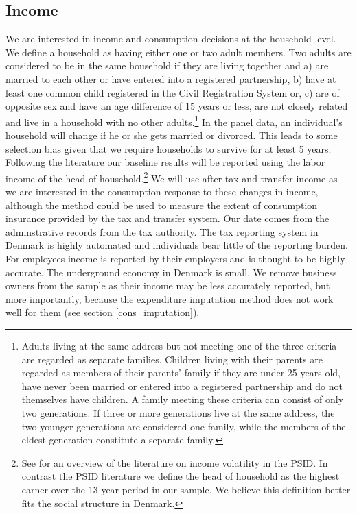 \documentclass[titlepage]{\econtex}\newcommand{\texname}{ConsumptionHeterogeneity}
\begin{document}
\subsection{Income} \label{income}
We are interested in income and consumption decisions at the household level. We define a household as having either one or two adult members. Two adults are considered to be in the same household if they are living together and a) are married to each other or have entered into a registered partnership, b) have at least one common child registered in the Civil Registration System or, c) are of opposite sex and have an age difference of 15 years or less, are not closely related and live in a household with no other adults.\footnote{Adults living at the same address but not meeting one of the three criteria are regarded as separate families. Children living with their parents are regarded as members of their parents' family if they are under 25 years old, have never been married or entered into a registered partnership and do not themselves have children. A family meeting these criteria can consist of only two generations. If three or more generations live at the same address, the two younger generations are considered one family, while the members of the eldest generation constitute a separate family.} In the panel data, an individual's household will change if he or she gets married or divorced. This leads to some selection bias given that we require households to survive for at least 5 years. Following the literature our baseline results will be reported using the labor income of the head of household.\footnote{See \cite{moffitt_income_2018} for an overview of the literature on income volatility in the PSID. In contrast the PSID literature we define the head of household as the highest earner over the 13 year period in our sample. We believe this definition better fits the social structure in Denmark.} We will use after tax and transfer income as we are interested in the consumption response to these changes in income, although the method could be used to measure the extent of consumption insurance provided by the tax and transfer system. Our date comes from the adminstrative records from the tax authority. The tax reporting system in Denmark is highly automated and individuals bear little of the reporting burden. For employees income is reported by their employers and is thought to be highly accurate. The underground economy in Denmark is small. We remove business owners from the sample as their income may be less accurately reported, but more importantly, because the expenditure imputation method does not work well for them (see section \ref{cons_imputation}).
\end{document}

